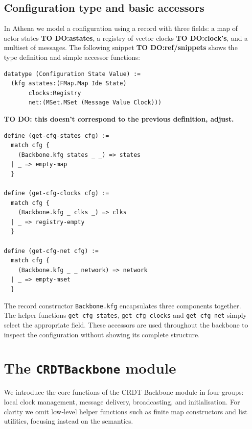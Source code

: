 \subsection{Configuration type and basic accessors}

In Athena we model a configuration using a record with three fields: a map of actor states \textbf{TO DO:astates}, a registry of vector clocks \textbf{TO DO:clock's}, and a multiset of messages.  
The following snippet \textbf{TO DO:ref/snippets} shows the type definition and simple accessor functions:

\begin{lstlisting}[language=Athena,style=athena]
datatype (Configuration State Value) :=
  (kfg astates:(FMap.Map Ide State)
       clocks:Registry
       net:(MSet.MSet (Message Value Clock)))
\end{lstlisting}
\textbf{TO DO: this doesn't correspond to the previous definition, adjust.}

\begin{lstlisting}[language=Athena,style=athena]
define (get-cfg-states cfg) :=
  match cfg {
    (Backbone.kfg states _ _) => states
  | _ => empty-map 
  }

define (get-cfg-clocks cfg) :=
  match cfg {
    (Backbone.kfg _ clks _) => clks
  | _ => registry-empty 
  }

define (get-cfg-net cfg) :=
  match cfg {
    (Backbone.kfg _ _ network) => network
  | _ => empty-mset 
  }
\end{lstlisting}

The record constructor \lstinline{Backbone.kfg} encapsulates three components together.  
The helper functions \lstinline{get-cfg-states}, \lstinline{get-cfg-clocks} and \lstinline{get-cfg-net} simply select the appropriate field.  
These accessors are used throughout the backbone to inspect the configuration without showing its complete structure.

\section{The \texttt{CRDTBackbone} module}

We introduce the core functions of the CRDT Backbone module in four groups: local clock management, message delivery, broadcasting, and initialisation.  
For clarity we omit low‑level helper functions such as finite map constructors and list utilities, focusing instead on the semantics.

